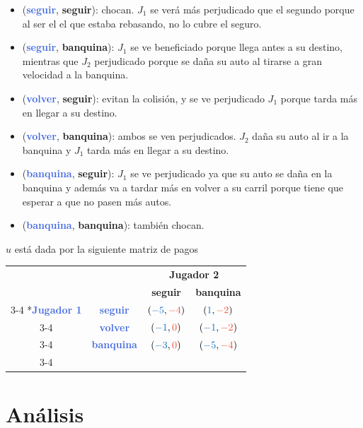 \documentclass{article}
\newcommand{\stratU}[1]{\textbf{\textcolor{RoyalBlue}{#1}}}
\newcommand{\stratD}[1]{\textbf{\textcolor{RedOrange}{#1}}}
\newcommand{\strat}[2]{(\stratU{#1}, \stratD{#2})}
\newcommand{\stratPay}[2]{(\textcolor{RoyalBlue}{#1}, \textcolor{RedOrange}{#2})}
\begin{document}
\begin{itemize}
    \item \strat{seguir}{seguir}: chocan. $J_1$ se verá más perjudicado que el segundo porque al ser el el que estaba rebasando, no lo cubre el seguro.
    \item \strat{seguir}{banquina}: $J_1$ se ve beneficiado porque llega antes a su destino, mientras que $J_2$ perjudicado porque se daña su auto al tirarse a gran velocidad a la banquina.
    \item \strat{volver}{seguir}: evitan la colisión, y se ve perjudicado $J_1$ porque tarda más en llegar a su destino.
    \item \strat{volver}{banquina}: ambos se ven perjudicados. $J_2$ daña su auto al ir a la banquina y $J_1$ tarda más en llegar a su destino.
    \item \strat{banquina}{seguir}: $J_1$ se ve perjudicado ya que su auto se daña en la banquina y además va a tardar más en volver a su carril porque tiene que esperar a que no pasen más autos.
    \item \strat{banquina}{banquina}: también chocan.
\end{itemize}

$u$ está dada por la siguiente matriz de pagos
\begin{center}
    \begin{table}[H]
    \setlength{\extrarowheight}{2pt}
    \begin{tabular}{cc|c|c|}
      & \multicolumn{1}{c}{} & \multicolumn{2}{c}{\stratD{Jugador 2}}\\
      & \multicolumn{1}{c}{} & \multicolumn{1}{c}{\stratD{seguir}}  & \multicolumn{1}{c}{\stratD{banquina}} \\\cline{3-4}
      \multirow{3}*{\stratU{Jugador 1}}  & \stratU{seguir} & $\stratPay{-5}{-4}$ & $\stratPay{1}{-2}$ \\\cline{3-4}
        & \stratU{volver} & $\stratPay{-1}{0}$ & $\stratPay{-1}{-2}$ \\\cline{3-4}
        & \stratU{banquina} & $\stratPay{-3}{0}$ & $\stratPay{-5}{-4}$ \\ \cline{3-4}
    \end{tabular}
    \end{table}
\end{center}

\section*{Análisis}
\end{document}
